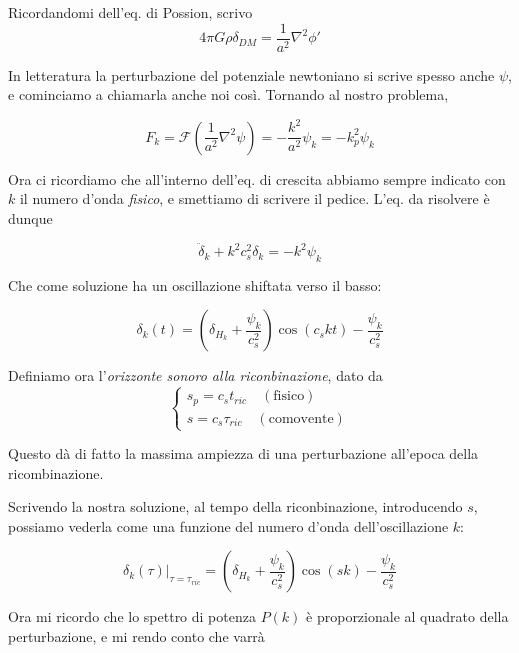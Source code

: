 \documentclass{report}
\begin{document}
Ricordandomi dell'eq. di Possion, scrivo 
\begin{equation}
    4\pi G \rho \delta_{DM} = \frac{1}{a^2}\nabla^2 \phi'
\end{equation}

In letteratura la perturbazione del potenziale newtoniano si scrive spesso anche $\psi$, e cominciamo a chiamarla anche noi così. Tornando al nostro problema, 

\begin{equation}
    F_k = \mathcal{F}\left(\frac{1}{a^2}\nabla^2 \psi\right) = -\frac{k^2}{a^2}\psi_k = -k_p^2 \psi_k
\end{equation}

Ora ci ricordiamo che all'interno dell'eq. di crescita abbiamo sempre indicato con $k$ il numero d'onda \emph{fisico}, e smettiamo di scrivere il pedice. L'eq. da risolvere è dunque 

\begin{equation}
    \ddot{\delta}_k + k^2c_s^2 \delta_k = -k^2\psi_k
\end{equation}

Che come soluzione ha un oscillazione shiftata verso il basso: 

\begin{equation}
    \delta_k(t) = \left(\delta_{H_k}  + \frac{\psi_k}{c_s^2}\right)\cos{(c_skt)} - \frac{\psi_k}{c_s^2}
\end{equation}

Definiamo ora l'\emph{orizzonte sonoro alla riconbinazione}, dato da 
\[\begin{cases}
    s_p = c_st_{ric} \quad (\text{fisico}) \\ s = c_s\tau_{ric} \quad (\text{comovente})
\end{cases}\]

Questo dà di fatto la massima ampiezza di una perturbazione all'epoca della ricombinazione. 

Scrivendo la nostra soluzione, al tempo della riconbinazione, introducendo $s$, possiamo vederla come una funzione del numero d'onda dell'oscillazione $k$: 

\begin{equation}
    \delta_k(\tau)|_{\tau = \tau_{ric}} = \left(\delta_{H_k}  + \frac{\psi_k}{c_s^2}\right)\cos{(sk)} - \frac{\psi_k}{c_s^2}
\end{equation}

Ora mi ricordo che lo spettro di potenza $P(k)$ è proporzionale al quadrato della perturbazione, e mi rendo conto che varrà 
\end{document}
